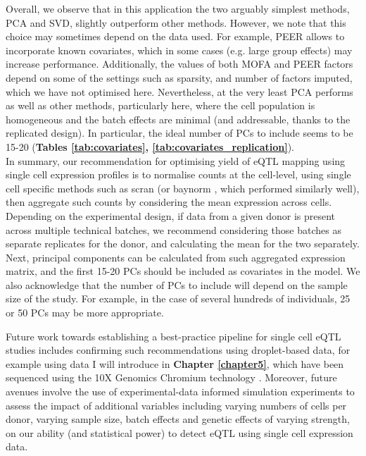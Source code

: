 Overall, we observe that in this application the two arguably simplest methods, PCA and SVD, slightly outperform other methods.
However, we note that this choice may sometimes depend on the data used.
For example, PEER allows to incorporate known covariates, which in some cases (e.g. large group effects) may increase performance.
Additionally, the values of both MOFA and PEER factors depend on some of the settings such as sparsity, and number of factors imputed, which we have not optimised here.
Nevertheless, at the very least PCA performs as well as other methods, particularly here, where the cell population is homogeneous and the batch effects are minimal (and addressable, thanks to the replicated design).
In particular, the ideal number of PCs to include seems to be 15-20 (\textbf{Tables \ref{tab:covariates}, \ref{tab:covariates_replication}}). 
\\

In summary, our recommendation for optimising yield of eQTL mapping using single cell expression profiles is to normalise counts at the cell-level, using single cell specific methods such as scran \cite{lun2016step} (or baynorm \cite{tang2020baynorm}, which performed similarly well), then aggregate such counts by considering the mean expression across cells.
Depending on the experimental design, if data from a given donor is present across multiple technical batches, we recommend considering those batches as separate replicates for the donor, and calculating the mean for the two separately.
Next, principal components can be calculated from such aggregated expression matrix, and the first 15-20 PCs should be included as covariates in the model.
We also acknowledge that the number of PCs to include will depend on the sample size of the study.
For example, in the case of several hundreds of individuals, 25 or 50 PCs may be more appropriate. 

\newpage

Future work towards establishing a best-practice pipeline for single cell eQTL studies includes confirming such recommendations using droplet-based data, for example using data I will introduce in \textbf{Chapter \ref{chapter5}}, which have been sequenced using the 10X Genomics Chromium technology \cite{zheng2017massively}. 
Moreover, future avenues involve the use of experimental-data informed simulation experiments to assess the impact of additional variables including varying numbers of cells per donor, varying sample size, batch effects and genetic effects of varying strength, on our ability (and statistical power) to detect eQTL using single cell expression data.

